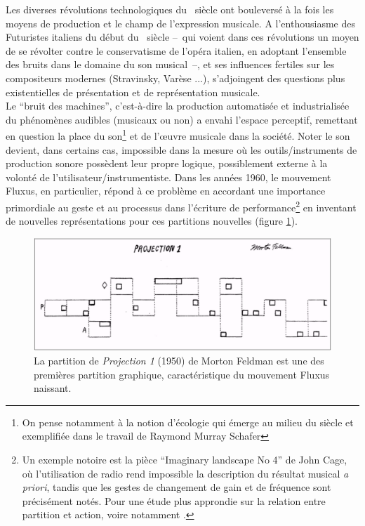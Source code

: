 \indent Les diverses révolutions technologiques du ~siècle ont bouleversé à la fois les moyens de production et le champ de l'expression musicale. A l'enthousiasme des Futuristes italiens du début du ~siècle --~qui voient dans ces révolutions un moyen de se révolter contre le conservatisme de l'opéra italien, en adoptant l'ensemble des bruits dans le domaine du son musical~--, et ses influences fertiles sur les compositeurs modernes (Stravinsky, Varèse ...), s'adjoingent des questions plus existentielles de présentation et de représentation musicale.\\
\indent Le ``bruit des machines'', c'est-à-dire la production automatisée et industrialisée du phénomènes audibles (musicaux ou non) a envahi l'espace perceptif, remettant en question la place du son\footnote{On pense notamment à la notion d'écologie qui émerge au milieu du siècle et exemplifiée dans le travail de Raymond Murray Schafer} et de l'œuvre musicale dans la société. Noter le son devient, dans certains cas, impossible dans la mesure où les outils/instruments de production sonore possèdent leur propre logique, possiblement externe à la volonté de l'utilisateur/instrumentiste. Dans les années 1960, le mouvement Fluxus, en particulier, répond à ce problème en accordant une importance primordiale au geste et au processus dans l'écriture de performance\footnote{Un exemple notoire est la pièce ``Imaginary landscape No 4'' de John Cage, où l'utilisation de radio rend impossible la description du résultat musical \textit{a priori}, tandis que les gestes de changement de gain et de fréquence sont précisément notés. Pour une étude plus approndie sur la relation entre partition et action, voire notamment \cite{kojs_notating_2011}.} en inventant de nouvelles représentations pour ces partitions nouvelles (figure \ref{fig:notation:feldman}).\\
\begin{figure}[!htbp]
	\captionsetup{format=plain}
	\includegraphics[width=\textwidth]{gfx/notation/MortonFeldman-Projection1.png}
	\caption[La partition de \textit{Projection 1} (1950) de Morton Feldman]{La partition de \textit{Projection 1} (1950) de Morton Feldman est une des premières partition graphique, caractéristique du mouvement Fluxus naissant.}
	\label{fig:notation:feldman}
\end{figure}
